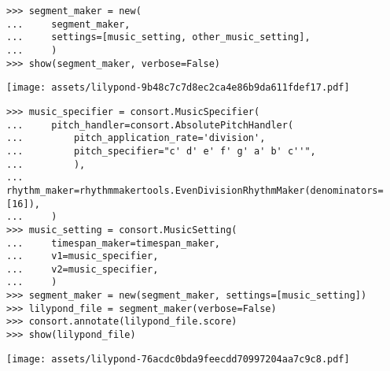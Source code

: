 \begin{singlespacing}
\vspace{-0.5\baselineskip}
\begin{lstlisting}
>>> segment_maker = new(
...     segment_maker,
...     settings=[music_setting, other_music_setting],
...     )
>>> show(segment_maker, verbose=False)
\end{lstlisting}
\noindent\texttt{[image: assets/lilypond-9b48c7c7d8ec2ca4e86b9da611fdef17.pdf]}
\end{singlespacing}

\begin{comment}
<abjad>[stylesheet=../consort.ily]
music_specifier = consort.MusicSpecifier(
    pitch_handler=consort.AbsolutePitchHandler(
        pitch_application_rate='division',
        pitch_specifier="c' d' e' f' g' a' b' c''",
        ),
    rhythm_maker=rhythmmakertools.EvenDivisionRhythmMaker(denominators=[16]),
    )
music_setting = consort.MusicSetting(
    timespan_maker=timespan_maker,
    v1=music_specifier,
    v2=music_specifier,
    )
segment_maker = new(segment_maker, settings=[music_setting])
lilypond_file = segment_maker(verbose=False)
consort.annotate(lilypond_file.score)
show(lilypond_file)
</abjad>
\end{comment}

\begin{singlespacing}
\vspace{-0.5\baselineskip}
\begin{lstlisting}
>>> music_specifier = consort.MusicSpecifier(
...     pitch_handler=consort.AbsolutePitchHandler(
...         pitch_application_rate='division',
...         pitch_specifier="c' d' e' f' g' a' b' c''",
...         ),
...     rhythm_maker=rhythmmakertools.EvenDivisionRhythmMaker(denominators=[16]),
...     )
>>> music_setting = consort.MusicSetting(
...     timespan_maker=timespan_maker,
...     v1=music_specifier,
...     v2=music_specifier,
...     )
>>> segment_maker = new(segment_maker, settings=[music_setting])
>>> lilypond_file = segment_maker(verbose=False)
>>> consort.annotate(lilypond_file.score)
>>> show(lilypond_file)
\end{lstlisting}
\noindent\texttt{[image: assets/lilypond-76acdc0bda9feecdd70997204aa7c9c8.pdf]}
\end{singlespacing}

\begin{comment}
<abjad>[stylesheet=../consort.ily]
music_specifier = new(
    music_specifier,
    pitch_handler__pitch_application_rate='phrase',
    )
music_setting = consort.MusicSetting(
    timespan_maker=timespan_maker,
    v1=music_specifier,
    v2=music_specifier,
    )
segment_maker = new(segment_maker, settings=[music_setting])
lilypond_file = segment_maker(verbose=False)
consort.annotate(lilypond_file.score)
show(lilypond_file)
</abjad>
\end{comment}

